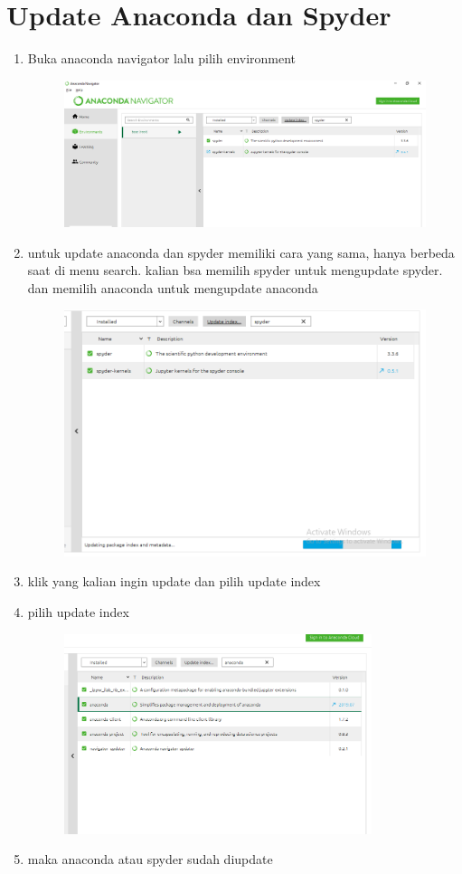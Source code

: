\chapter*{Update Anaconda dan Spyder}

\begin{enumerate}
	\item Buka anaconda navigator lalu pilih environment
	\begin{figure} [h]
	\includegraphics[width=12cm]{section/spy/spy1.png}
	\centering
	\end{figure}
	
    \item untuk update anaconda dan spyder memiliki cara yang sama, hanya berbeda saat di menu search. kalian bsa memilih spyder untuk mengupdate spyder. dan memilih anaconda untuk mengupdate anaconda
	\begin{figure} [h]
	\includegraphics[width=12cm]{section/spy/spy2.png}
	\centering
	\end{figure}
	
	\item klik yang kalian ingin update dan pilih update index
	
	
	\item pilih update index
	\begin{figure} [h]
	\includegraphics[width=9cm]{section/spy/spy3.png}
	\centering
	\end{figure}
	
	\item maka anaconda atau spyder sudah diupdate
	
	
	
\end{enumerate}